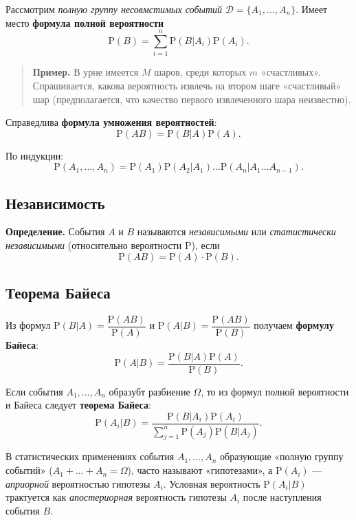 \documentclass[11pt,a4paper]{article}
\begin{document}
Рассмотрим \emph{полную группу несовмстимых событий}
\(\mathcal{D} = \{A_1, \dots, A_n\}\). Имеет место \textbf{формула
полной вероятности}
\[ \mathrm{P}(B) = \sum_{i=1}^n \mathrm{P}(B|A_i) \mathrm{P}(A_i). \]

\begin{quote}
\textbf{Пример.} В урне имеется \(M\) шаров, среди которых \(m\)
«счастливых». Спрашивается, какова вероятность извлечь на втором шаге
«счастливый» шар (предполагается, что качество первого извлеченного шара
неизвестно).
\end{quote}

Справедлива \textbf{формула умножения вероятностей}:
\[ \mathrm{P}(AB) = \mathrm{P}(B|A) \mathrm{P}(A). \]

По индукции:
\[ \mathrm{P}(A_1, \dots, A_n) = \mathrm{P}(A_1) \mathrm{P}(A_2|A_1) \dots \mathrm{P}(A_n|A_1 \dots A_{n-1}). \]

    \hypertarget{ux43dux435ux437ux430ux432ux438ux441ux438ux43cux43eux441ux442ux44c}{%
\subsection{Независимость}\label{ux43dux435ux437ux430ux432ux438ux441ux438ux43cux43eux441ux442ux44c}}

\textbf{Определение.} События \(A\) и \(B\) называются
\emph{независимыми} или \emph{статистически независимыми} (относительно
вероятности \(\mathrm{P}\)), если
\[ \mathrm{P}(AB) = \mathrm{P}(A) \cdot \mathrm{P}(B). \]

    \hypertarget{ux442ux435ux43eux440ux435ux43cux430-ux431ux430ux439ux435ux441ux430}{%
\subsection{Теорема
Байеса}\label{ux442ux435ux43eux440ux435ux43cux430-ux431ux430ux439ux435ux441ux430}}

Из формул \(\mathrm{P}(B|A) = \dfrac{\mathrm{P}(AB)}{\mathrm{P}(A)}\) и
\(\mathrm{P}(A|B) = \dfrac{\mathrm{P}(AB)}{\mathrm{P}(B)}\) получаем
\textbf{формулу Байеса}:
\[ \mathrm{P}(A|B) = \dfrac{\mathrm{P}(B|A) \mathrm{P}(A)}{\mathrm{P}(B)}. \]

Если события \(A_1, \dots, A_n\) образубт разбиение \(\Omega\), то из
формул полной вероятности и Байеса следует \textbf{теорема Байеса}:
\[ \mathrm{P}(A_i|B) = \frac{\mathrm{P}(B|A_i) \mathrm{P}(A_i)}{\sum_{j=1}^{n} \mathrm{P}(A_j) \mathrm{P}(B|A_j)}. \]

В статистических применениях события \(A_1, \dots, A_n\) образующие
«полную группу событий» (\(A_1 + \dots + A_n = \Omega\)), часто называют
«гипотезами», а \(\mathrm{P}(A_i)\) --- \emph{априорной} вероятностью
гипотезы \(A_i\). Условная вероятность \(\mathrm{P}(A_i|B)\) трактуется
как \emph{апостериорная} вероятность гипотезы \(A_i\) после наступления
события \(B\).
\end{document}
